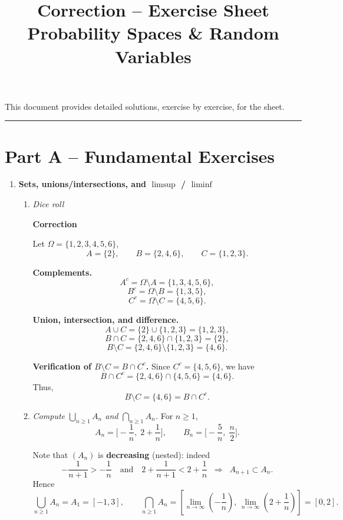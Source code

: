 \documentclass[11pt]{article}
\title{Correction -- Exercise Sheet\\[0.3em]
{\large Probability Spaces \& Random Variables}}
\author{}
\date{}
\begin{document}
\maketitle

\noindent
This document provides detailed solutions, exercise by exercise, for the sheet.

\bigskip
\hrule
\bigskip

\section*{Part A -- Fundamental Exercises}
\begin{enumerate}

\item \textbf{Sets, unions/intersections, and $\limsup$ / $\liminf$}

\begin{enumerate}[label=(\alph*)]

\item  \emph{Dice roll}

\textbf{Correction}

Let $\Omega=\{1,2,3,4,5,6\}$,
\[
A=\{2\},\qquad B=\{2,4,6\},\qquad C=\{1,2,3\}.
\]

\medskip
\textbf{Complements.}
\[
A^c=\Omega\setminus A=\{1,3,4,5,6\},
\]
\[
B^c=\Omega\setminus B=\{1,3,5\},
\]
\[
C^c=\Omega\setminus C=\{4,5,6\}.
\]

\medskip
\textbf{Union, intersection, and difference.}
\[
A\cup C=\{2\}\cup\{1,2,3\}=\{1,2,3\},
\]
\[
B\cap C=\{2,4,6\}\cap\{1,2,3\}=\{2\},
\]
\[
B\setminus C=\{2,4,6\}\setminus\{1,2,3\}=\{4,6\}.
\]

\medskip
\textbf{Verification of $B\setminus C=B\cap C^c$.}
Since $C^c=\{4,5,6\}$, we have
\[
B\cap C^c=\{2,4,6\}\cap\{4,5,6\}=\{4,6\}.
\]
Thus,
\[
B\setminus C=\{4,6\}=B\cap C^c.
\]

\item \emph{Compute $\bigcup_{n\ge1}A_n$ and $\bigcap_{n\ge1}A_n$.}
For $n\ge1$,
\[
A_n=\Big[-\frac1n,\;2+\frac1n\Big],
\qquad
B_n=\Big[-\frac5n,\;\frac{n}{2}\Big].
\]


Note that $(A_n)$ is \textbf{decreasing} (nested): indeed
\[
-\frac{1}{n+1} > -\frac{1}{n}
\quad\text{and}\quad
2+\frac{1}{n+1} < 2+\frac{1}{n}
\;\;\Rightarrow\;\;
A_{n+1}\subset A_n.
\]
Hence
\[
\bigcup_{n\ge1} A_n = A_1 = [-1,3],
\qquad
\bigcap_{n\ge1} A_n
=
\left[\lim_{n\to\infty}\left(-\frac1n\right),\,\lim_{n\to\infty}\left(2+\frac1n\right)\right]
=
[0,2].
\]


\end{enumerate}
\end{enumerate}
\end{document}
